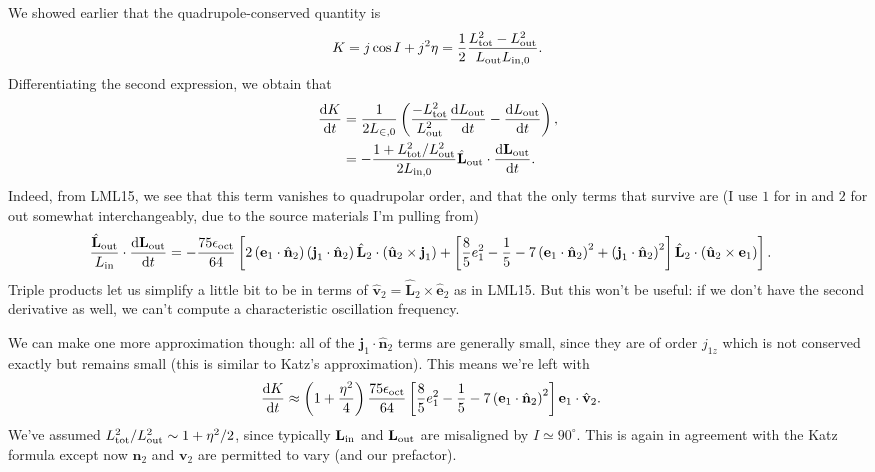 \documentclass[11pt,
        usenames, %
        dvipsnames %
    ]{article}
\newcommand*{\rd}[2]{\frac{\mathrm{d}#1}{\mathrm{d}#2}}
\newcommand*{\bm}[1]{\boldsymbol{\mathbf{#1}}}
\newcommand*{\uv}[1]{\hat{\bm{#1}}}
\newcommand*{\p}[1]{\left(#1\right)}
\newcommand*{\s}[1]{\left[#1\right]}
\begin{document}
We showed earlier that the quadrupole-conserved quantity is
\begin{equation}
    K = j \cos I + j^2\eta = \frac{1}{2}\frac{L_{\rm tot}^2 - L_{\rm out}^2}{
        L_{\rm out}L_{\rm in, 0}}.
\end{equation}
Differentiating the second expression, we obtain that
\begin{align}
    \rd{K}{t} &= \frac{1}{2L_{\in, 0}}
        \p{\frac{-L_{\rm tot}^2}{L_{\rm out}^2} \rd{L_{\rm out}}{t}
            - \rd{L_{\rm out}}{t}},\\
        &= -\frac{1 + L_{\rm tot}^2 / L_{\rm out}^2}{2L_{\rm in, 0}}
            \uv{L}_{\rm out} \cdot \rd{\bm{L}_{\rm out}}{t}.
\end{align}
Indeed, from LML15, we see that this term vanishes to quadrupolar order, and
that the only terms that survive are (I use $1$ for in and $2$ for out somewhat
interchangeably, due to the source materials I'm pulling from)
\begin{align}
    \frac{\uv{L}_{\rm out}}{L_{\rm in}} \cdot \rd{\bm{L}_{\rm out}}{t}
        &= -\frac{75\epsilon_{\rm oct}}{64}\s{
            2\p{\bm{e}_1 \cdot \uv{n}_2}\p{\bm{j}_1 \cdot \uv{n}_2}
                \uv{L}_2 \cdot \p{\uv{u}_2 \times \bm{j}_1}
            + \s{\frac{8}{5}e_1^2 - \frac{1}{5}
                - 7\p{\bm{e}_1 \cdot \uv{n}_2}^2
                + \p{\bm{j}_1 \cdot \uv{n}_2}^2}
                \uv{L}_2 \cdot \p{\uv{u}_2 \times \bm{e}_1}
            }.
\end{align}
Triple products let us simplify a little bit to be in terms of $\uv{v}_2 =
\uv{L}_2 \times \uv{e}_2$ as in LML15. But this won't be useful: if we don't
have the second derivative as well, we can't compute a characteristic
oscillation frequency.

We can make one more approximation though: all of the $\bm{j}_1 \cdot \uv{n}_2$
terms are generally small, since they are of order $j_{1z}$ which is not
conserved exactly but remains small (this is similar to Katz's approximation).
This means we're left with
\begin{align}
    \rd{K}{t}
        &\approx \p{1 + \frac{\eta^2}{4}}
        \frac{75\epsilon_{\rm oct}}{64}
            \s{\frac{8}{5}e_1^2 - \frac{1}{5}
                - 7\p{\bm{e}_1 \cdot \uv{n}_2}^2}
                \bm{e}_1 \cdot \uv{v}_2.
\end{align}
We've assumed $L_{\rm tot}^2 / L_{\rm out}^2 \sim 1 + \eta^2/2$, since typically
$\bm{L}_{\rm in}$ and $\bm{L}_{\rm out}$ are misaligned by $I \simeq 90^\circ$.
This is again in agreement with the Katz formula except now $\bm{n}_2$ and
$\bm{v}_2$ are permitted to vary (and our prefactor).
\end{document}
